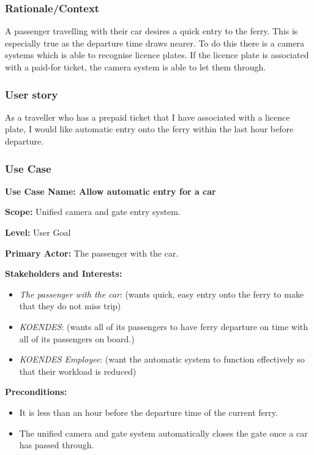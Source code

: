 \subsubsection{Rationale/Context}
A passenger travelling with their car desires a quick entry to the ferry. This is especially true as the departure time draws nearer. To do this there is a camera systems which is able to recognise licence plates. If the licence plate is associated with a paid-for ticket, the camera system is able to let them through.   
\subsubsection{User story}

As a traveller who has a prepaid ticket that I have associated with a licence plate, I would like automatic entry onto the ferry within the last hour before departure.  
\subsubsection{Use Case}
\creator{\studentB}


\textbf{Use Case Name: Allow automatic entry for a car} 

\textbf{Scope:} Unified camera and gate entry system.

\textbf{Level:} User Goal

\textbf{Primary Actor:} The passenger with the car.

\textbf{Stakeholders and Interests:} 
\begin{itemize}
\item \textit{The passenger with the car}: (wants quick, easy entry onto the ferry to make that they do not miss trip)
\item \textit{KOENDES}: (wants all of its passengers to have ferry departure on time with all of its passengers on board.)
\item \textit{KOENDES Employee}: (want the automatic system to function effectively so that their workload is reduced)
\end{itemize}
\textbf{Preconditions:} 
\begin{itemize}
\item It is less than an hour before the departure time of the current ferry.
\item The unified camera and gate system automatically closes the gate once a car has passed through.
\end{itemize}


